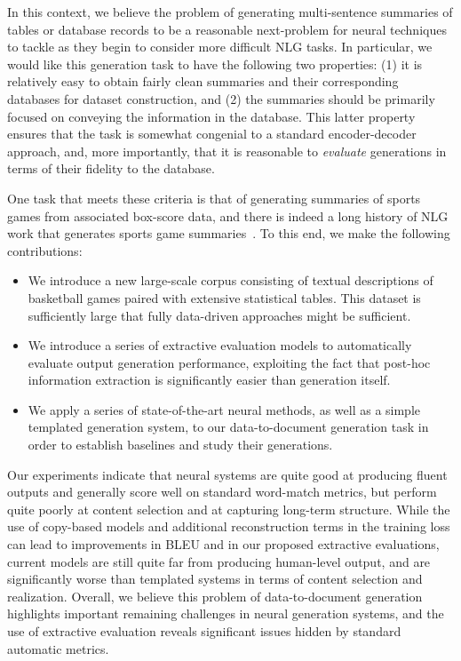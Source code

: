 \documentclass[11pt,letterpaper]{article}
\begin{document}
In this context, we believe the problem of generating multi-sentence summaries of tables or database records to be a reasonable next-problem for neural techniques to tackle as they begin to consider more difficult NLG tasks. In particular, we would like this generation task to have the following two properties: (1) it is relatively easy to obtain fairly clean summaries and their corresponding databases for dataset construction, and (2) the summaries should be primarily focused on conveying the information in the database. This latter property ensures that the task is somewhat congenial to a standard encoder-decoder approach, and, more importantly, that it is reasonable to \textit{evaluate} generations in terms of their fidelity to the database.

One task that meets these criteria is that of generating summaries of sports games from associated box-score data, and there is indeed a long history of NLG work that generates sports game summaries~\citep{robin1994revision,tanaka1998reactive,
barzilay2005collective}. To this end, we make the following contributions:
\begin{itemize}
\item We introduce a new large-scale corpus
consisting of textual descriptions of basketball games paired with
extensive statistical tables. This dataset is sufficiently large that fully data-driven
approaches might be sufficient. 
\item We
introduce a series of extractive evaluation models to automatically
evaluate output generation performance, exploiting the fact that post-hoc information extraction is significantly easier than generation itself. 
\item  We apply a series of state-of-the-art neural methods, as well as a simple templated generation system, to our
data-to-document generation task in order to establish baselines and study
their generations.
\end{itemize}

Our experiments indicate that neural systems are
quite good at producing fluent outputs and generally score well on standard
word-match metrics, but perform quite poorly at content selection and at capturing long-term structure. While the use of copy-based models and additional reconstruction terms in the training loss can lead to improvements in
BLEU and in our proposed extractive evaluations, current models are still
quite far from producing human-level output, and are significantly
worse than templated systems in terms of content selection and realization. Overall, we believe this
problem of data-to-document generation highlights important remaining
challenges in neural generation systems, and the use of extractive
evaluation reveals significant issues hidden by standard automatic
metrics.
\end{document}
